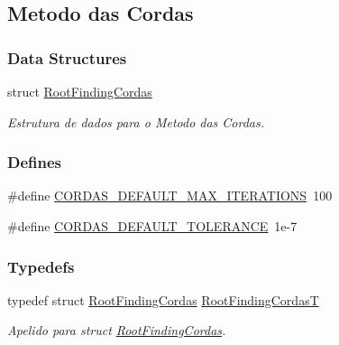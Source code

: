 \hypertarget{group____cordas}{
\subsection{Metodo das Cordas}
\label{group____cordas}
}
\subsubsection*{Data Structures}
\begin{CompactItemize}
\item 
struct \hyperlink{structRootFindingCordas}{RootFindingCordas}
\begin{CompactList}\small\item\em Estrutura de dados para o Metodo das Cordas. \item\end{CompactList}\end{CompactItemize}
\subsubsection*{Defines}
\begin{CompactItemize}
\item 
\#define \hyperlink{group____cordas_ga16d78672b3564becdd978dc37001261}{CORDAS\_\-DEFAULT\_\-MAX\_\-ITERATIONS}~100
\item 
\#define \hyperlink{group____cordas_g4caa3a434138569b567ffd432d5f12fc}{CORDAS\_\-DEFAULT\_\-TOLERANCE}~1e-7
\end{CompactItemize}
\subsubsection*{Typedefs}
\begin{CompactItemize}
\item 
typedef struct \hyperlink{structRootFindingCordas}{RootFindingCordas} \hyperlink{group____cordas_g64e9f7aa0b38cc4c243e37b277b115d4}{RootFindingCordasT}
\begin{CompactList}\small\item\em Apelido para struct \hyperlink{structRootFindingCordas}{RootFindingCordas}. \item\end{CompactList}\end{CompactItemize}
